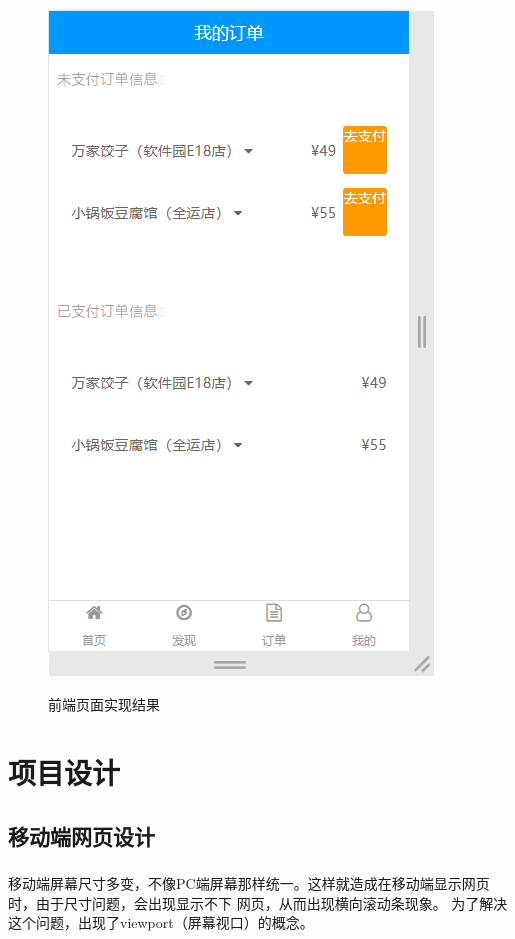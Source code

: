 \begin{figure}[H]
{\begin{minipage}[t]{0.22\linewidth}
            \includegraphics[scale=0.3]{figures/2.2.8.png}\\
        \end{minipage}
    }
    \centering
    \caption{前端页面实现结果}
\end{figure}

\section{项目设计}
\subsection{移动端网页设计}
\subsubsection*{}
移动端屏幕尺寸多变，不像PC端屏幕那样统一。这样就造成在移动端显示网页时，由于尺寸问题，会出现显示不下
网页，从而出现横向滚动条现象。 为了解决这个问题，出现了viewport（屏幕视口）的概念。
